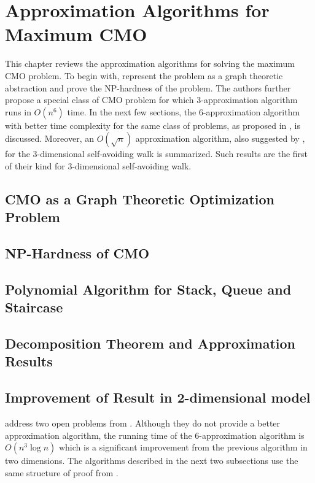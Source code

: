\chapter{Approximation Algorithms for Maximum CMO}
\label{approximation}

This chapter reviews the approximation algorithms for solving the maximum CMO problem. To begin with, \citet{goip99} represent the problem as a graph theoretic abstraction and prove the NP-hardness of the problem. The authors further propose a special class of CMO problem for which 3-approximation algorithm runs in $O(n^6)$ time. In the next few sections, the 6-approximation algorithm with better time complexity for the same class of problems, as proposed in \citet{agmw07}, is discussed. Moreover, an $O(\sqrt n)$ approximation algorithm, also suggested by \citet{agmw07}, for the 3-dimensional self-avoiding walk is summarized. Such results are the first of their kind for 3-dimensional self-avoiding walk.

\section {CMO as a Graph Theoretic Optimization Problem}


\section{NP-Hardness of CMO}


\section{Polynomial Algorithm for Stack, Queue and Staircase}


\section{Decomposition Theorem and Approximation Results}


\section {Improvement of Result in 2-dimensional model}
\citet{agmw07} address two open problems from \citet{goip99}. Although they do not provide a better approximation algorithm, the running time of the 6-approximation algorithm is $O(n^3 \log n)$ which is a significant improvement from the previous algorithm in two dimensions. The algorithms described in the next two subsections use the same structure of proof from \citet{goip99}.
